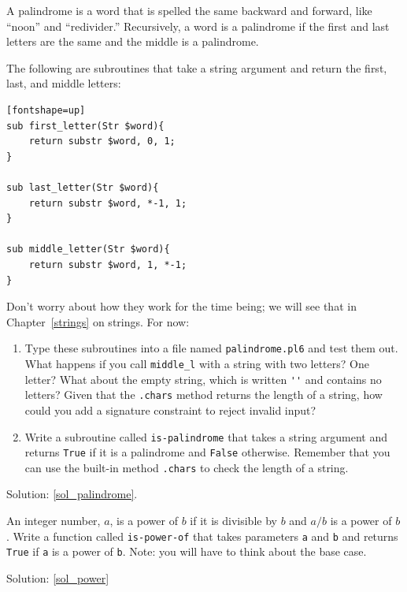 \begin{exercise}
\label{palindrome}

A palindrome is a word that is spelled the same backward and
forward, like ``noon'' and ``redivider.''  Recursively, a word
is a palindrome if the first and last letters are the same
and the middle is a palindrome.

The following are subroutines that take a string argument and
return the first, last, and middle letters:

\begin{verbatim}[fontshape=up]
sub first_letter(Str $word){
    return substr $word, 0, 1;
}

sub last_letter(Str $word){
    return substr $word, *-1, 1;
}

sub middle_letter(Str $word){
    return substr $word, 1, *-1;
}
\end{verbatim}
%
Don't worry about how they work for the time being; we will see 
that in Chapter~\ref{strings} on strings. For now:

\begin{enumerate}

\item Type these subroutines into a file named {\tt palindrome.pl6}
and test them out.  What happens if you call \verb'middle_l' with
a string with two letters?  One letter?  What about the empty
string, which is written \verb"''" and contains no letters? 
Given that the {\tt .chars} method returns the length of a 
string, how could you add a signature constraint to reject invalid input?

\item Write a subroutine called \verb"is-palindrome" that takes
a string argument and returns {\tt True} if it is a palindrome
and {\tt False} otherwise.  Remember that you can use the
built-in method {\tt .chars} to check the length of a string.

\end{enumerate}

Solution: \ref{sol_palindrome}.

\end{exercise}

\begin{exercise}
\label{power}

An integer number, $a$, is a power of $b$ if it is divisible by $b$
and $a/b$ is a power of $b$.  Write a function called
\verb"is-power-of" that takes parameters {\tt a} and {\tt b}
and returns {\tt True} if {\tt a} is a power of {\tt b}.
Note: you will have to think about the base case.

Solution: \ref{sol_power}

\end{exercise}


